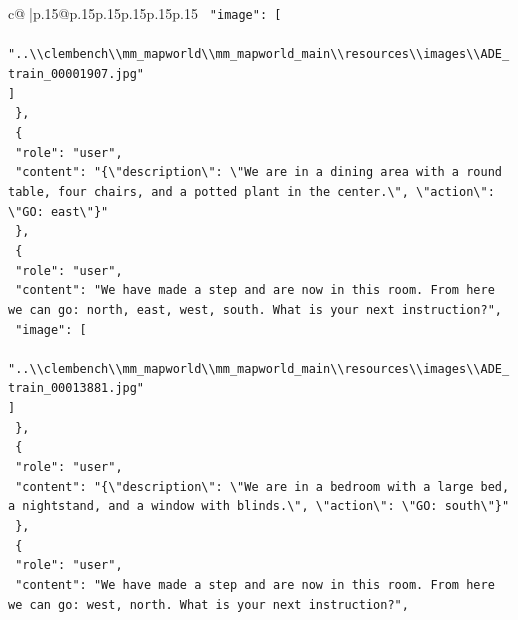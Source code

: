 \documentclass{article}
\begin{document}
{\begin{supertabular}{c@{$\;$}|p{.15\linewidth}@{}p{.15\linewidth}p{.15\linewidth}p{.15\linewidth}p{.15\linewidth}p{.15\linewidth}}
{{{\texttt{    "image": {[}} \\
\texttt{      "..\textbackslash{}\textbackslash{}clembench\textbackslash{}\textbackslash{}mm\_mapworld\textbackslash{}\textbackslash{}mm\_mapworld\_main\textbackslash{}\textbackslash{}resources\textbackslash{}\textbackslash{}images\textbackslash{}\textbackslash{}ADE\_train\_00001907.jpg"} \\
\texttt{    {]}} \\
\texttt{  \},} \\
\texttt{  \{} \\
\texttt{    "role": "user",} \\
\texttt{    "content": "\{\textbackslash{}"description\textbackslash{}": \textbackslash{}"We are in a dining area with a round table, four chairs, and a potted plant in the center.\textbackslash{}", \textbackslash{}"action\textbackslash{}": \textbackslash{}"GO: east\textbackslash{}"\}"} \\
\texttt{  \},} \\
\texttt{  \{} \\
\texttt{    "role": "user",} \\
\texttt{    "content": "We have made a step and are now in this room. From here we can go: north, east, west, south. What is your next instruction?",} \\
\texttt{    "image": {[}} \\
\texttt{      "..\textbackslash{}\textbackslash{}clembench\textbackslash{}\textbackslash{}mm\_mapworld\textbackslash{}\textbackslash{}mm\_mapworld\_main\textbackslash{}\textbackslash{}resources\textbackslash{}\textbackslash{}images\textbackslash{}\textbackslash{}ADE\_train\_00013881.jpg"} \\
\texttt{    {]}} \\
\texttt{  \},} \\
\texttt{  \{} \\
\texttt{    "role": "user",} \\
\texttt{    "content": "\{\textbackslash{}"description\textbackslash{}": \textbackslash{}"We are in a bedroom with a large bed, a nightstand, and a window with blinds.\textbackslash{}", \textbackslash{}"action\textbackslash{}": \textbackslash{}"GO: south\textbackslash{}"\}"} \\
\texttt{  \},} \\
\texttt{  \{} \\
\texttt{    "role": "user",} \\
\texttt{    "content": "We have made a step and are now in this room. From here we can go: west, north. What is your next instruction?",} \\
}}}
\end{supertabular}}
\end{document}
